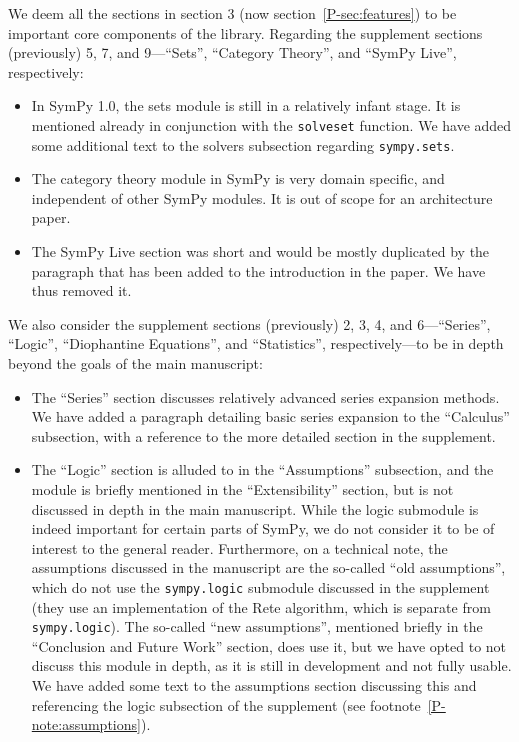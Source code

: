 \documentclass[answers,12pt]{exam}
\begin{document}
\begin{questions}
\begin{solution}
We deem all the sections in section 3 (now section~\ref{P-sec:features}) to be important core
components of the library. Regarding the supplement sections (previously) 5,
7, and 9---``Sets'', ``Category Theory'', and ``SymPy Live'',
respectively:
\begin{itemize}
\item In SymPy 1.0, the sets module is still in
a relatively infant stage. It is mentioned already in conjunction with the
\texttt{solveset} function. We have added some additional text to the solvers
subsection regarding \texttt{sympy.sets}.

\item The category theory module in SymPy
is very domain specific, and independent of other SymPy modules. It is out of
scope for an architecture paper.

\item The SymPy Live section was short and would be mostly duplicated by the
  paragraph that has been added to the introduction in the paper. We have thus
  removed it.
\end{itemize}

We also consider the supplement sections (previously) 2, 3, 4, and
6---``Series'', ``Logic'', ``Diophantine Equations'', and ``Statistics'',
respectively---to be in depth beyond the goals of the main manuscript:

\begin{itemize}
\item The ``Series'' section discusses relatively advanced series expansion methods. We
have added a paragraph detailing basic series expansion to the ``Calculus''
subsection, with a reference to the more detailed section in the supplement.

\item The ``Logic'' section is alluded to in the ``Assumptions'' subsection,
  and the module is briefly mentioned in the ``Extensibility'' section,
  but is not discussed in depth in the main manuscript. While the logic
  submodule is indeed important for certain parts of SymPy, we do not consider
  it to be of interest to the general reader. Furthermore, on a technical
  note, the assumptions discussed in the manuscript are the so-called ``old
  assumptions'', which do not use the \texttt{sympy.logic} submodule discussed
  in the supplement (they use an implementation of the Rete algorithm, which
  is separate from \texttt{sympy.logic}). The so-called ``new assumptions'',
  mentioned briefly in the ``Conclusion and Future Work'' section, does use
  it, but we have opted to not discuss this module in depth, as it is still in
  development and not fully usable. We have added some text to the assumptions
  section discussing this and referencing the logic subsection of the
  supplement (see footnote~\ref{P-note:assumptions}).


\end{itemize}
\end{solution}
\end{questions}
\end{document}

